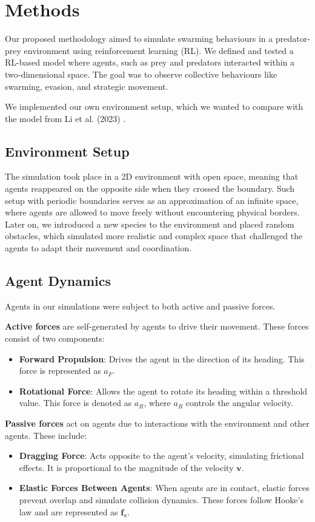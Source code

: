\documentclass[9pt]{pnas-new}
\renewcommand{\vec}[1]{\ensuremath{\mathbf{#1}}}
\begin{document}
	\section*{Methods}
	
	Our proposed methodology aimed to simulate swarming behaviours in a predator-prey environment using reinforcement learning (RL). 
	We defined and tested a RL-based model where agents, such as prey and predators interacted within a two-dimensional space. The goal was to observe collective behaviours like swarming, evasion, and strategic movement.
	
	We implemented our own environment setup, which we wanted to compare with the model from Li et al. (2023) \cite{li2023predator}.
	
	\subsection{Environment Setup}
	The simulation took place in a 2D environment with open space, meaning that agents reappeared on the opposite side when they crossed the boundary.
	Such setup with periodic boundaries serves as an approximation of an infinite space, where agents are allowed to move freely without encountering physical borders. 
	Later on, we introduced a new species to the environment and placed random obstacles, which simulated more realistic and complex space that challenged the agents to adapt their movement and coordination. 
	
	\subsection{Agent Dynamics}
	Agents in our simulations were subject to both active and passive forces.
	
	\textbf{Active forces} are self-generated by agents to drive their movement. These forces consist of two components:
	\begin{itemize}
		\item \textbf{Forward Propulsion}: Drives the agent in the direction of its heading. This force is represented as \( a_F \).
		\item \textbf{Rotational Force}: Allows the agent to rotate its heading within a threshold value. This force is denoted as \( a_R \), where \( a_R \) controls the angular velocity.
	\end{itemize}
	
	\textbf{Passive forces} act on agents due to interactions with the environment and other agents. These include:
	\begin{itemize}
		\item \textbf{Dragging Force}: Acts opposite to the agent's velocity, simulating frictional effects. It is proportional to the magnitude of the velocity \( \vec{v} \).
		\item \textbf{Elastic Forces Between Agents}: When agents are in contact, elastic forces prevent overlap and simulate collision dynamics. These forces follow Hooke's law and are represented as \( \vec{f}_a \).
	\end{itemize}
	
\end{document}
